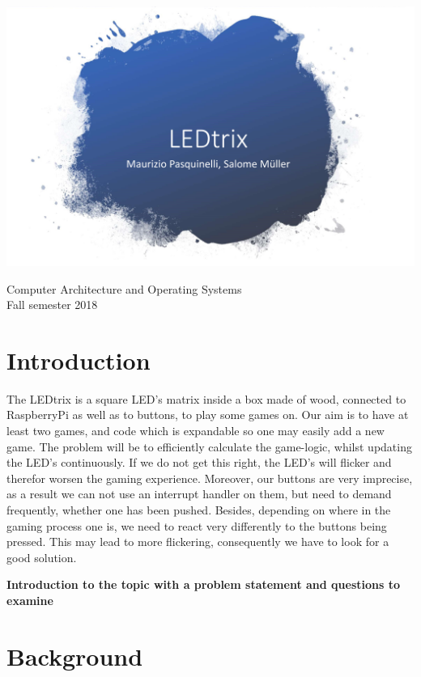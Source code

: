 \documentclass[a4paper,12pt]{article}
\begin{document}
\begin{titlepage}
\centering
\vspace*{5cm}

 \includegraphics[width = 1\textwidth]{LEDtrix_Logo.png}
\vspace{1cm}

\large{Computer Architecture and Operating Systems\\Fall semester 2018}
\end{titlepage}
 
 \section{Introduction}
 
 The LEDtrix is a square LED's matrix inside a box made of wood, connected to RaspberryPi as well as to buttons, to play some games on.
 Our aim is to have at least two games, and code which is expandable so one may easily add a new game.
 The problem will be to efficiently calculate the game-logic, whilst updating the LED's continuously.
 If we do not get this right, the LED's will flicker and therefor worsen the gaming experience.
 Moreover, our buttons are very imprecise, as a result we can not use an interrupt handler on them, but need to demand frequently, whether one has been pushed.
 Besides, depending on where in the gaming process one is, we need to react very differently to the buttons being pressed.
 This may lead to more flickering, consequently we have to look for a good solution.
 
\textbf{Introduction to the topic with a problem statement and questions to examine}
 
 \section{Background}
 
\end{document}
